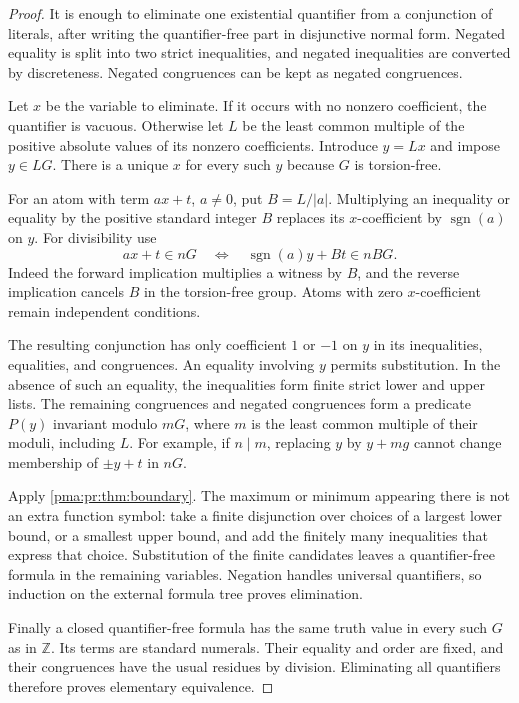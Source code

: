 \documentclass[11pt]{article}
\numberwithin{equation}{section}
\theoremstyle{definition}
\theoremstyle{remark}
\newcommand{\Z}{\mathbb Z}
\begin{document}
\begin{proof}
It is enough to eliminate one existential quantifier from a conjunction of
literals, after writing the quantifier-free part in disjunctive normal form.
Negated equality is split into two strict inequalities, and negated
inequalities are converted by discreteness. Negated congruences can be
kept as negated congruences.

Let $x$ be the variable to eliminate. If it occurs with no nonzero
coefficient, the quantifier is vacuous. Otherwise let $L$ be the least
common multiple of the positive absolute values of its nonzero
coefficients. Introduce $y=Lx$ and impose $y\in LG$. There is a unique
$x$ for every such $y$ because $G$ is torsion-free.

For an atom with term $ax+t$, $a\ne0$, put $B=L/|a|$. Multiplying an
inequality or equality by the positive standard integer $B$ replaces its
$x$-coefficient by $\operatorname{sgn}(a)$ on $y$. For divisibility use
\begin{equation}\label{pma:pr:eq:scalingcongruence}
 ax+t\in nG
 \quad\Longleftrightarrow\quad
 \operatorname{sgn}(a)y+Bt\in nBG.
\end{equation}
Indeed the forward implication multiplies a witness by $B$, and the
reverse implication cancels $B$ in the torsion-free group. Atoms with
zero $x$-coefficient remain independent conditions.

The resulting conjunction has only coefficient $1$ or $-1$ on $y$ in its
inequalities, equalities, and congruences. An equality involving $y$ permits
substitution. In the absence of such an equality, the inequalities form
finite strict lower and upper lists. The remaining congruences and
negated congruences form a predicate $P(y)$ invariant modulo $mG$, where
$m$ is the least common multiple of their moduli, including $L$. For example,
if $n\mid m$, replacing $y$ by $y+mg$ cannot change membership of
$\pm y+t$ in $nG$.

Apply \cref{pma:pr:thm:boundary}. The maximum or minimum appearing there is not an
extra function symbol: take a finite disjunction over choices of a largest
lower bound, or a smallest upper bound, and add the finitely many
inequalities that express that choice. Substitution of the finite
candidates leaves a quantifier-free formula in the remaining variables.
Negation handles universal quantifiers, so induction on the external
formula tree proves elimination.

Finally a closed quantifier-free formula has the same truth value in every
such $G$ as in $\Z$. Its terms are standard numerals. Their equality and
order are fixed, and their congruences have the usual residues by division.
Eliminating all quantifiers therefore proves elementary equivalence.
\end{proof}
\end{document}
